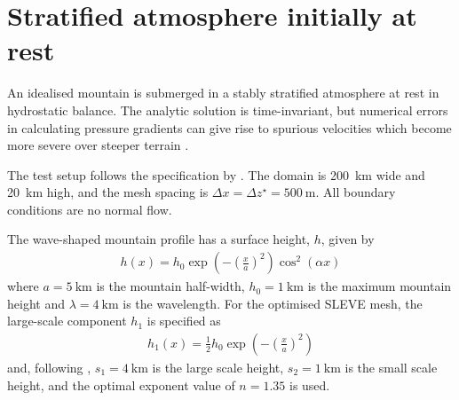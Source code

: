 \section{Stratified atmosphere initially at rest}
\label{sec:slanted:resting}


An idealised mountain is submerged in a stably stratified atmosphere at rest in hydrostatic balance.  The analytic solution is time-invariant, but numerical errors in calculating pressure gradients can give rise to spurious velocities which become more severe over steeper terrain \citep{klemp2011}.

The test setup follows the specification by \cite{klemp2011}.  The domain is \SI{200}{\kilo\meter} wide and \SI{20}{\kilo\meter} high, and the mesh spacing is \(\Delta x = \Delta z^\star = \SI{500}{\meter}\).  All boundary conditions are no normal flow.

The wave-shaped mountain profile has a surface height, $h$, given by
\begin{align}
	h(x) = h_0 \exp \left( - \left( \frac{x}{a} \right)^2 \right) \cos^2 \left( \alpha x \right) \label{eqn:resting:mountain}
\end{align}
where $a = \SI{5}{\kilo\meter}$ is the mountain half-width, $h_0 = \SI{1}{\kilo\meter}$ is the maximum mountain height and $\lambda = \SI{4}{\kilo\meter}$ is the wavelength.  For the optimised SLEVE mesh, the large-scale component $h_1$ is specified as
\begin{align}
h_1(x) = \frac{1}{2} h_0 \exp \left( - \left( \frac{x}{a} \right)^2 \right)
\end{align}
and, following \cite{leuenberger2010}, $s_1 = \SI{4}{\kilo\meter}$ is the large scale height, $s_2 = \SI{1}{\kilo\meter}$ is the small scale height, and the optimal exponent value of $n = 1.35$ is used.

